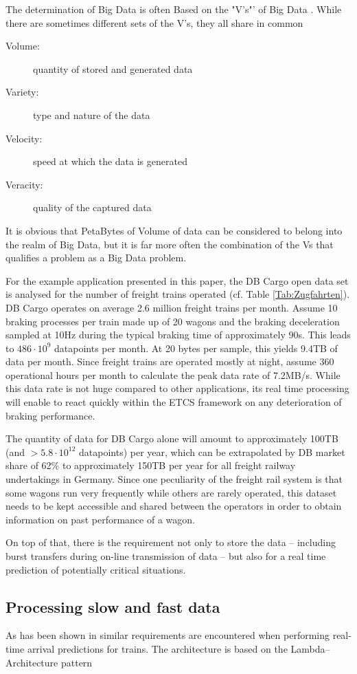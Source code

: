 \documentclass[a4paper, 12pt]{scrartcl}
\begin{document}
The determination of Big Data is often Based on the "V's"' of Big Data \cite{hilbert2016big}. While there are sometimes different sets of the V's, they all share in common
\begin{description}
	\item[Volume:] quantity of stored and generated data 
	\item[Variety:] type and nature of the data
	\item[Velocity:] speed at which the data is generated
	\item[Veracity:] quality of the captured data
\end{description}
It is obvious that PetaBytes of Volume of data can be considered to belong into the realm of Big Data, but it is far more often the combination of the Vs that qualifies a problem as a Big Data problem.

For the example application presented in this paper, the DB Cargo open data set \cite{DBOpenDataZug} is analysed for the number of freight trains operated (cf. Table \ref{Tab:Zugfahrten}). DB Cargo operates on average 2.6 million freight trains per month. Assume 10 braking processes per train made up of 20 wagons and the braking deceleration sampled at 10Hz during the typical braking time of approximately 90s. This leads to $486\cdot 10^9$ datapoints per month. At 20 bytes per sample, this yields 9.4TB of data per month. Since freight trains are operated mostly at night, assume 360 operational hours per month to calculate the peak data rate of 7.2MB/s. While this data rate is not huge compared to other applications, its real time processing will enable to react quickly within the ETCS framework on any deterioration of braking performance.

The quantity of data for DB Cargo alone will amount to approximately 100TB (and $>5.8\cdot 10^{12}$ datapoints) per year, which can be extrapolated by DB market share of 62\% to approximately 150TB per year for all freight railway undertakings in Germany. Since one peculiarity of the freight rail system is that some wagons run very frequently while others are rarely operated, this dataset needs to be kept accessible and shared between the operators in order to obtain  information on past performance of a wagon.

On top of that, there is the requirement not only to store the data -- including burst transfers during on-line transmission of data -- but also for a real time prediction of potentially critical situations.

\subsection{Processing slow and fast data}
As has been shown in \cite{elsen:M318} similar requirements are encountered when performing real-time arrival predictions for trains. The architecture is based on the Lambda--Architecture pattern \cite{Marz2015}
\end{document}
